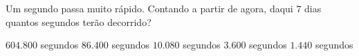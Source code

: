 Um segundo passa muito rápido. Contando a partir de agora, daqui $7$ dias quantos segundos terão decorrido?

$604.800$ segundos
$86.400$ segundos
$10.080$  segundos
$3.600$ segundos
$1.440$ segundos


